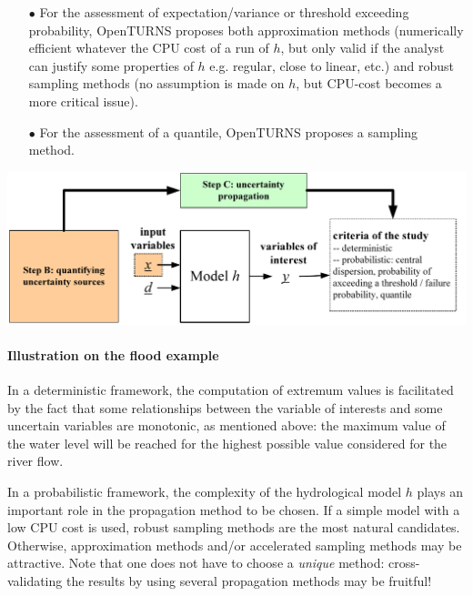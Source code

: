 \begin{itemize}

\item[$\bullet$] For the assessment of expectation/variance or threshold exceeding probability, OpenTURNS proposes both approximation methods (numerically efficient whatever the CPU cost of a run of $h$, but only valid if the analyst can justify some properties of $h$ e.g. regular, close to linear, etc.) and robust sampling methods (no assumption is made on $h$, but CPU-cost becomes a more critical issue).

\item[$\bullet$] For the assessment of  a quantile, OpenTURNS proposes a sampling method.

\end{itemize}

\begin{center}
  \includegraphics[scale=0.8]{Figures/flow4.pdf}
\end{center}

\paragraph{Illustration on the flood example}
\par

In a deterministic framework, the computation of extremum values is facilitated by the fact that some relationships between the variable of interests and some uncertain variables are monotonic, as mentioned above: the maximum value of the water level will be reached for the highest possible value considered for the river flow.

In a probabilistic framework, the complexity of the hydrological model $h$ plays an important role in the propagation method to be chosen. If a simple model with a low CPU cost is used, robust sampling methods are the most natural candidates. Otherwise, approximation methods and/or accelerated sampling methods may be attractive. Note that one does not have to choose a {\em unique} method: cross-validating the results by using several propagation methods may be fruitful!

